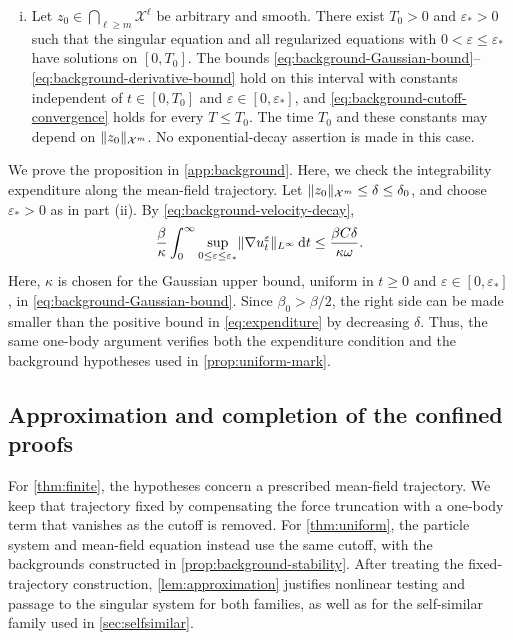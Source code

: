 \documentclass[11pt,reqno]{amsart}
\numberwithin{equation}{section}
\theoremstyle{plain}
\theoremstyle{remark}
\DeclarePairedDelimiter{\norm}{\lVert}{\rVert}
\newcommand{\Xspace}{\mathcal X}
\begin{document}
\begin{prop}
\begin{enumerate}[(i)]
\item Let $z_0\in\bigcap_{\ell\ge m}\Xspace^\ell$ be arbitrary and smooth. There exist $T_0>0$ and $\varepsilon_*>0$ such that the singular equation and all regularized equations with $0<\varepsilon\le\varepsilon_*$ have solutions on $[0,T_0]$. The bounds \eqref{eq:background-Gaussian-bound}--\eqref{eq:background-derivative-bound} hold on this interval with constants independent of $t\in[0,T_0]$ and $\varepsilon\in[0,\varepsilon_*]$, and \eqref{eq:background-cutoff-convergence} holds for every $T\le T_0$. The time $T_0$ and these constants may depend on $\norm{z_0}_{\Xspace^m}$. No exponential-decay assertion is made in this case.
\end{enumerate}
\end{prop}

We prove the proposition in \cref{app:background}. Here, we check the integrability expenditure along the mean-field trajectory. Let $\norm{z_0}_{\Xspace^m}\le\delta\le\delta_0$, and choose $\varepsilon_*>0$ as in part (ii). By \eqref{eq:background-velocity-decay},
\begin{equation}\label{eq:small-expenditure}
 \frac\beta\kappa\int_0^\infty\sup_{0\le\varepsilon\le\varepsilon_*}\norm{\nabla u_t^\varepsilon}_{L^\infty}\dd t
              \le\frac{\beta C\delta}{\kappa\omega}.
\end{equation}
Here, $\kappa$ is chosen for the Gaussian upper bound, uniform in $t\ge0$ and $\varepsilon\in[0,\varepsilon_*]$, in \eqref{eq:background-Gaussian-bound}. Since $\beta_0>\beta/2$, the right side can be made smaller than the positive bound in \eqref{eq:expenditure} by decreasing $\delta$. Thus, the same one-body argument verifies both the expenditure condition and the background hypotheses used in \cref{prop:uniform-mark}.

\par\endgroup

\begingroup

\subsection{Approximation and completion of the confined proofs}\label{sec:completion}

For \cref{thm:finite}, the hypotheses concern a prescribed mean-field trajectory. We keep that trajectory fixed by compensating the force truncation with a one-body term that vanishes as the cutoff is removed. For \cref{thm:uniform}, the particle system and mean-field equation instead use the same cutoff, with the backgrounds constructed in \cref{prop:background-stability}. After treating the fixed-trajectory construction, \cref{lem:approximation} justifies nonlinear testing and passage to the singular system for both families, as well as for the self-similar family used in \cref{sec:selfsimilar}.
\end{document}
